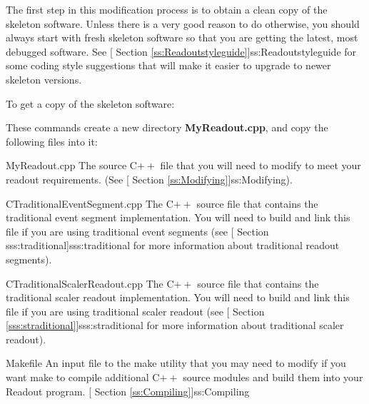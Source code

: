    The first step in this modification process is to obtain a
   clean copy of the skeleton software.   Unless there is a
   very good reason to do otherwise, you should always start
   with fresh skeleton software so that you are getting the
   latest, most debugged software.  See
   [
      Section \ref{ss:Readoutstyleguide}]{ss:Readoutstyleguide} for some
   coding style suggestions that will make it easier to upgrade
   to newer skeleton versions.
   
   To get a copy of the skeleton software:
   \begin{example}
   \computer{$<>$ }
   \computer{$<>$ }
    
   
   \end{example}

   These commands create a new directory {\bf MyReadout.cpp}, and
   copy the following files into it:
   \begin{description}
      \item{MyReadout.cpp} The source C$++$ file that you will
	 need to modify to meet your readout requirements.
	 (See 
	 [
	 Section \ref{ss:Modifying}]{ss:Modifying}).
      \item{CTraditionalEventSegment.cpp}  The C$++$ source file that
	  contains the traditional event segment implementation.  You will need
	  to build and link this file if you are using traditional event
	  segments (see  [
	Section {sss:traditional}]{sss:traditional} for more information
	about traditional readout segments).
      \item {CTraditionalScalerReadout.cpp}  The C$++$ source file that
	  contains the traditional scaler readout implementation.  You
	  will need to build and link this file if you are using traditional
	  scaler readout (see [
	 Section \ref{sss:straditional}]{sss:straditional} for more 
	information about traditional scaler readout).
      \item{Makefile}  An input file to the make utility that
	 you may need to modify if you want make to compile
	 additional C$++$ source modules and build them into
	 your Readout program.
	 [
	    Section \ref{ss:Compiling}]{ss:Compiling}
   \end{description}

